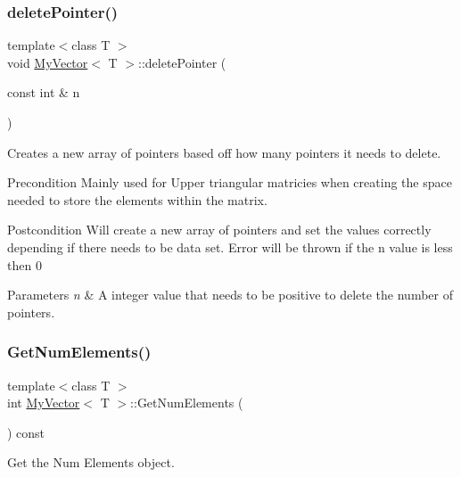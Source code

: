 \subsubsection{\texorpdfstring{deletePointer()}{deletePointer()}}
{\footnotesize\ttfamily template$<$class T $>$ \\
void \mbox{\hyperlink{class_my_vector}{My\+Vector}}$<$ T $>$\+::delete\+Pointer (\begin{DoxyParamCaption}\item[{const int \&}]{n }\end{DoxyParamCaption})}



Creates a new array of pointers based off how many pointers it needs to delete. 

\begin{DoxyPrecond}{Precondition}
Mainly used for Upper triangular matricies when creating the space needed to store the elements within the matrix. 
\end{DoxyPrecond}
\begin{DoxyPostcond}{Postcondition}
Will create a new array of pointers and set the values correctly depending if there needs to be data set. Error will be thrown if the n value is less then 0
\end{DoxyPostcond}

\begin{DoxyParams}{Parameters}
{\em n} & A integer value that needs to be positive to delete the number of pointers. \\
\hline
\end{DoxyParams}
\mbox{\label{class_my_vector_a5806423f48877c084cc436ecdffa756c}} 
\subsubsection{\texorpdfstring{GetNumElements()}{GetNumElements()}}
{\footnotesize\ttfamily template$<$class T $>$ \\
int \mbox{\hyperlink{class_my_vector}{My\+Vector}}$<$ T $>$\+::Get\+Num\+Elements (\begin{DoxyParamCaption}{ }\end{DoxyParamCaption}) const}



Get the Num Elements object. 

